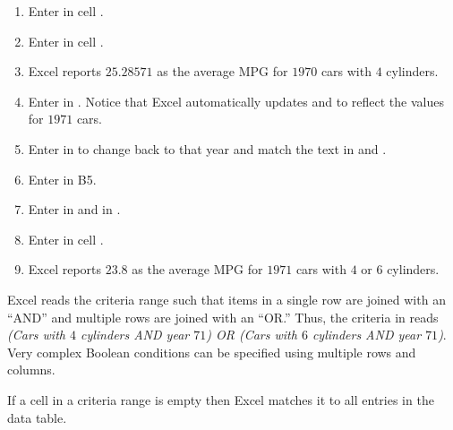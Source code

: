 \begin{enumerate}
	\item Enter  in cell .
	\item Enter  in cell .
	\item Excel reports $ 25.28571 $ as the average MPG for $ 1970 $ cars with $ 4 $ cylinders.
	
	\item Enter  in . Notice that Excel automatically updates  and  to reflect the values for $ 1971 $ cars.
	\item Enter  in  to change back to that year and match the text in  and .

	\item Enter  in B5.
	\item Enter  in  and  in .
	\item Enter  in cell .
	\item Excel reports $ 23.8 $ as the average MPG for $ 1971 $ cars with $ 4 $ or $ 6 $ cylinders. 
\end{enumerate}	
	
Excel reads the criteria range such that items in a single row are joined with an ``AND'' and multiple rows are joined with an ``OR.'' Thus, the criteria in  reads \textit{(Cars with $ 4 $ cylinders AND year $ 71 $) OR (Cars with $ 6 $ cylinders AND year $ 71 $)}. Very complex Boolean conditions can be specified using multiple rows and columns.

If a cell in a criteria range is empty then Excel matches it to all entries in the data table.

